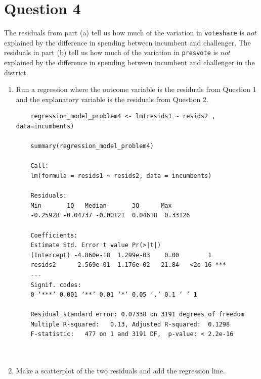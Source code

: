 \documentclass[12pt,letterpaper]{article}
\begin{document}
\section*{Question 4}%
\noindent The residuals from part (a) tell us how much of the variation in \texttt{voteshare} is $not$ explained by the difference in spending between incumbent and challenger. The residuals in part (b) tell us how much of the variation in \texttt{presvote} is $not$ explained by the difference in spending between incumbent and challenger in the district.
\begin{enumerate}
\item Run a regression where the outcome variable is the residuals from Question 1 and the explanatory variable is the residuals from Question 2.	
\begin{verbatim}
	regression_model_problem4 <- lm(resids1 ~ resids2 , data=incumbents)
	
	summary(regression_model_problem4)
	
	Call:
	lm(formula = resids1 ~ resids2, data = incumbents)
	
	Residuals:
	Min       1Q   Median       3Q      Max 
	-0.25928 -0.04737 -0.00121  0.04618  0.33126 
	
	Coefficients:
	Estimate Std. Error t value Pr(>|t|)    
	(Intercept) -4.860e-18  1.299e-03    0.00        1    
	resids2      2.569e-01  1.176e-02   21.84   <2e-16 ***
	---
	Signif. codes:  
	0 ‘***’ 0.001 ‘**’ 0.01 ‘*’ 0.05 ‘.’ 0.1 ‘ ’ 1
	
	Residual standard error: 0.07338 on 3191 degrees of freedom
	Multiple R-squared:   0.13,	Adjusted R-squared:  0.1298 
	F-statistic:   477 on 1 and 3191 DF,  p-value: < 2.2e-16
	
	
\end{verbatim}
\item Make a scatterplot of the two residuals and add the regression line. 	\vspace{6cm}
\begin{verbatim}


\end{verbatim}
\end{enumerate}
\end{document}

